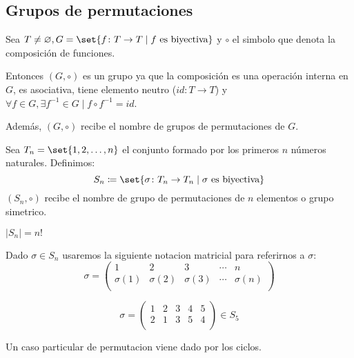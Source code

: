 \subsection{Grupos de permutaciones}
\begin{definition}
	Sea \(T \neq \varnothing, G = \set{f \colon T \to T \mid f \text{ es biyectiva} }\) y \(\circ \) el simbolo que denota la composición de funciones.
	
	Entonces \((G, \circ )\) es un grupo ya que la composición es una operación interna en \(G \), es asociativa, tiene elemento neutro (\(id\colon T \to T \)) y \(\forall f \in G, \exists f^{-1} \in G \mid f \circ f^{-1} = id \).
	
	Además, \((G, \circ )\) recibe el nombre de grupos de permutaciones de \(G\).
\end{definition}
\begin{definition}
	Sea \(T_n = \set{1,2,\ldots,n }\) el conjunto formado por los primeros \(n \) números naturales. Definimos:
	\[
		S_n \coloneqq \set{\sigma \colon T_n \to T_n \mid \sigma \text{ es biyectiva} }
	\]
	\((S_n, \circ )\) recibe el nombre de grupo de permutaciones de \(n \) elementos o grupo simetrico.
\end{definition}
\begin{proposition}
	\(|S_n| = n! \)
\end{proposition}
Dado \(\sigma \in S_n\) usaremos la siguiente notacion matricial para referirnos a \(\sigma \):
\[
	\sigma = \begin{pmatrix}
		1          & 2          & 3          & \cdots & n         \\
		\sigma(1 ) & \sigma(2 ) & \sigma(3 ) & \cdots & \sigma(n) \\
	\end{pmatrix}
\]
\begin{example}
	\[
		\sigma = \begin{pmatrix}
			1 & 2 & 3 & 4 & 5 \\
			2 & 1 & 3 & 5 & 4 \\
		\end{pmatrix} \in S_5
	\]
	
\end{example}
Un caso particular de permutacion viene dado por los ciclos.
